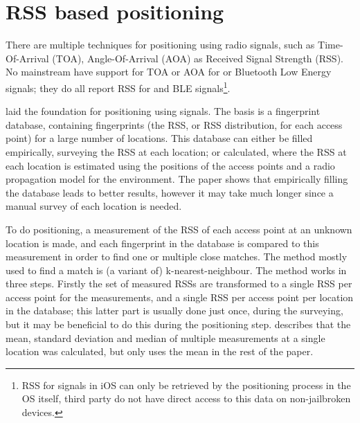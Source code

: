 \section{RSS based positioning}
\label{sec:architecture-rss-based-positioning}
There are multiple techniques for positioning using radio signals, such as Time-Of-Arrival (TOA), Angle-Of-Arrival (AOA) as Received Signal Strength (RSS).
No mainstream \devices have support for TOA or AOA for \wifi or Bluetooth Low Energy signals; they do all report RSS for \wifi and BLE signals\footnote{RSS for \wifi signals in iOS can only be retrieved by the positioning process in the OS itself, third party \apps do not have direct access to this data on non-jailbroken devices.}.

\citet{bahl2000radar} laid the foundation for positioning using \wifi signals.
The basis is a fingerprint database, containing fingerprints (the RSS, or RSS distribution, for each access point) for a large number of locations.
This database can either be filled empirically, surveying the RSS at each location; or calculated, where the RSS at each location is estimated using the positions of the access points and a radio propagation model for the environment.
The paper shows that empirically filling the database leads to better results, however it may take much longer since a manual survey of each location is needed.

To do positioning, a measurement of the RSS of each access point at an unknown location is made, and each fingerprint in the database is compared to this measurement in order to find one or multiple close matches.
The method mostly used to find a match is (a variant of) k-nearest-neighbour.
The method works in three steps.
Firstly the set of measured RSSs are transformed to a single RSS per access point for the measurements, and a single RSS per access point per location in the database; this latter part is usually done just once, during the surveying, but it may be beneficial to do this during the positioning step.
\citet{bahl2000radar} describes that the mean, standard deviation and median of multiple measurements at a single location was calculated, but only uses the mean in the rest of the paper.

